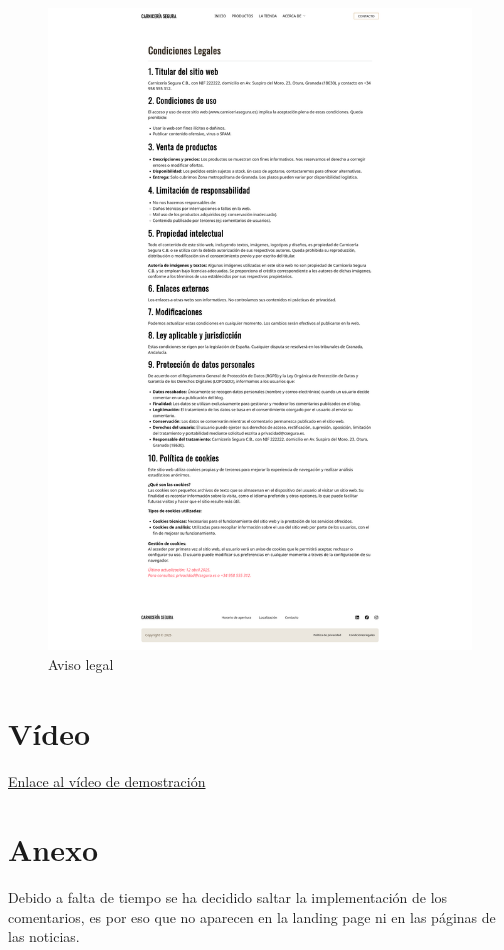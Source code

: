 \documentclass[a4paper]{article}
\begin{document}
\begin{figure}[H]
    \centering
    \includegraphics[width=1\textwidth]{images/legal-conditions.png}
    \caption{Aviso legal}
\end{figure}


\section{Vídeo}

\href{https://drive.google.com/file/d/1qvQA09GjjR_p3fuuL1GLrYEpJQDwJftM/view?usp=sharing}{Enlace al vídeo de demostración}


\section{Anexo}

Debido a falta de tiempo se ha decidido saltar la implementación de los comentarios, es por eso que no aparecen en la landing page ni en las páginas de las noticias.
\end{document}
